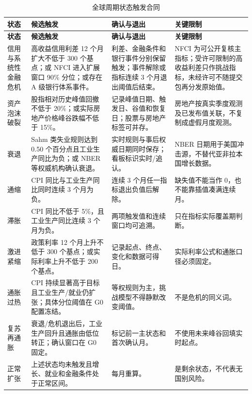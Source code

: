 \documentclass[UTF8,fontset=windows,12pt,openany]{ctexbook}
\begin{document}
\clearpage
\begin{landscape}
\begin{longtable}{p{3.1cm}p{6.8cm}p{5.2cm}p{4.4cm}}
\caption{全球周期状态触发合同}\label{tab:global-cycle-rules}\\
\toprule
\textbf{状态} & \textbf{候选触发} & \textbf{确认与退出} & \textbf{关键限制}\\
\midrule
\endfirsthead
\toprule \textbf{状态} & \textbf{候选触发} & \textbf{确认与退出} & \textbf{关键限制}\\ \midrule
\endhead
信用与系统性金融危机 & 高收益信用利差 12 个月扩大不低于 300 个基点；或 NFCI 进入扩展窗口 90\% 分位；或存在 A 级银行体系事件。 & 利差、金融条件和银行事件分别保留触发；事件解除或指标连续 3 个月退出阈值后结束。 & NFCI 为可公开复核主指标；受许可限制的高收益利差只作挑战指标，未经许可不随提交包再分发原始值。\\
资产泡沫破裂 & 股指相对历史峰值回撤不低于 20\%；或实际房地产价格峰谷跌幅不低于 15\%。 & 记录峰值日期、触发日、谷值和恢复日；股票与房地产标签可并存。 & 房地产按真实季度观测及已发布值关联，不复制成虚假月度观测。\\
衰退 & Sahm 类失业规则达到 0.50 个百分点且工业生产同比为负；或 NBER 等权威机构确认衰退。 & 实时规则与事后权威日期同时保存；看板标识实时/追认。 & NBER 日期用于美国冲击源，不替代亚非拉本国增长数据。\\
通缩 & CPI 同比与工业生产同比同时连续 3 个月为负。 & 连续 3 个月任一指标退出负值后解除。 & 缺失值不能当作 0，也不能靠插值凑满连续月。\\
滞胀 & CPI 同比不低于 5\%，且工业生产同比连续 3 个月为负。 & 两项触发值和连续窗口均可追溯。 & 只在指标实际覆盖期判断。\\
激进紧缩 & 政策利率 12 个月上升不低于 300 个基点；或实际利率上升不低于 200 个基点。 & 记录起点、终点、变化和数据可得日。 & 实际利率公式和通胀口径必须固定。\\
通胀过热 & CPI 持续显著高于目标且工业生产/就业仍扩张；具体分位阈值在 G0 配置冻结。 & 等权规则为主，挑战模型不得静默改变阈值。 & 不是危机的同义词。\\
复苏再通胀 & 衰退/危机退出后，工业生产回升且通胀由低位转正；确认窗口在 G0 固定。 & 标记前一主状态和首次确认月。 & 不使用未来峰谷回填实时起点。\\
正常扩张 & 上述状态均未触发且增长、就业和金融条件处于正常区间。 & 每月重算。 & 是剩余状态，不代表无国别风险。\\
\bottomrule
\end{longtable}
\end{landscape}
\end{document}
